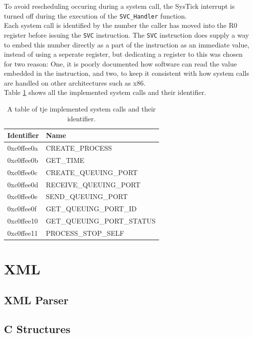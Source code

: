 To avoid rescheduling occuring during a system call, the SysTick interrupt is
turned off during the execution of the \texttt{SVC\_Handler} function.\\
Each system call is identified by the number the caller has moved into the R0
register before issuing the \texttt{SVC} instruction. The \texttt{SVC}
instruction does supply a way to embed this number directly as a part of the
instruction as an immediate value, instead of using a seperate register, but
dedicating a register to this was chosen for two reason: One, it is poorly
documented how software can read the value embedded in the instruction, and two,
to keep it consistent with how system calls are handled on other architectures
such as x86.\\
Table \ref{tab:syscalls} shows all the implemented system calls and their
identifier.

\begin{table}
\centering
	\begin{tabular}{| l | l |}
		\hline
		Identifier		&	Name \\
		\hline
		0xc0ffee0a		&	CREATE\_PROCESS 			\\
		\hline
		0xc0ffee0b		&	GET\_TIME					\\
		\hline
		0xc0ffee0c		&	CREATE\_QUEUING\_PORT 		\\
		\hline
		0xc0ffee0d		&	RECEIVE\_QUEUING\_PORT 		\\
		\hline
		0xc0ffee0e		&	SEND\_QUEUING\_PORT 		\\
		\hline
		0xc0ffee0f		&	GET\_QUEUING\_PORT\_ID 		\\
		\hline
		0xc0ffee10		&	GET\_QUEUING\_PORT\_STATUS	\\
		\hline
		0xc0ffee11		&	PROCESS\_STOP\_SELF 		\\
		\hline		
	\end{tabular}
\caption{A table of tje implemented system calls and their identifier.}
\label{tab:syscalls}
\end{table}

\section{XML}

\subsection{XML Parser}

\subsection{C Structures}


